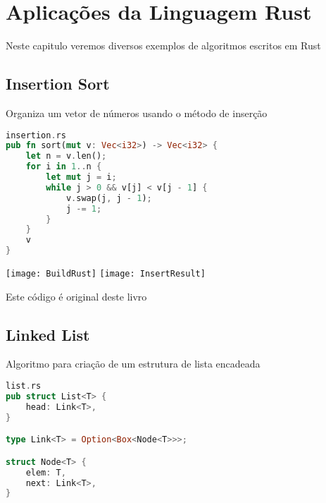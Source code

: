 
\chapter{ Aplica\c{c}\~{o}es da Linguagem Rust}

Neste capitulo veremos diversos exemplos de algoritmos escritos em Rust

\section{Insertion Sort}
Organiza um vetor de n\'{u}meros usando o m\'{e}todo de inser\c{c}\~{a}o

\begin{lstlisting}[language=rust]
insertion.rs
pub fn sort(mut v: Vec<i32>) -> Vec<i32> {
    let n = v.len();
    for i in 1..n {
        let mut j = i;
        while j > 0 && v[j] < v[j - 1] {
            v.swap(j, j - 1);
            j -= 1;
        }
    }
    v
}
\end{lstlisting}

\texttt{[image: BuildRust]}
\texttt{[image: InsertResult]}

Este c\'{o}digo \'{e} original deste livro

\section{Linked List}
Algoritmo para cria\c{c}\~{a}o de um estrutura de lista encadeada

\begin{lstlisting}[language=rust]
list.rs
pub struct List<T> {
    head: Link<T>,
}

type Link<T> = Option<Box<Node<T>>>;

struct Node<T> {
    elem: T,
    next: Link<T>,
}
\end{lstlisting}

